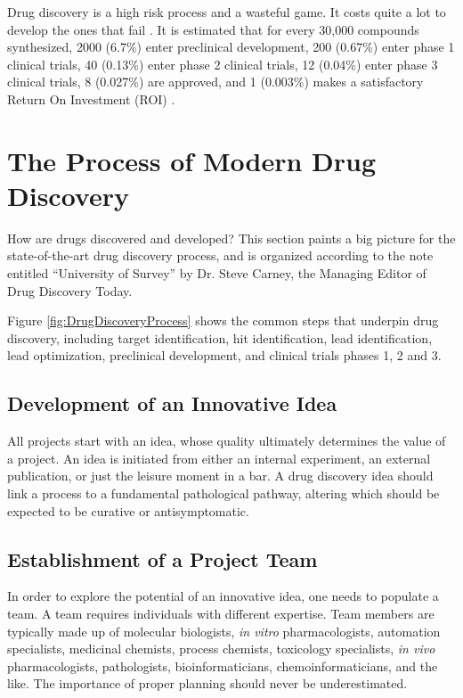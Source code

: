 Drug discovery is a high risk process and a wasteful game. It costs quite a lot to develop the ones that fail \citep{688}. It is estimated that for every 30,000 compounds synthesized, 2000 (6.7\%) enter preclinical development, 200 (0.67\%) enter phase 1 clinical trials, 40 (0.13\%) enter phase 2 clinical trials, 12 (0.04\%) enter phase 3 clinical trials, 8 (0.027\%) are approved, and 1 (0.003\%) makes a satisfactory Return On Investment (ROI) \citep{713}.

\section{The Process of Modern Drug Discovery}

How are drugs discovered and developed? This section paints a big picture for the state-of-the-art drug discovery process, and is organized according to the note entitled ``University of Survey'' by Dr. Steve Carney, the Managing Editor of Drug Discovery Today.

Figure \ref{fig:DrugDiscoveryProcess} \citep{716} shows the common steps that underpin drug discovery, including target identification, hit identification, lead identification, lead optimization, preclinical development, and clinical trials phases 1, 2 and 3.

\subsection{Development of an Innovative Idea}

All projects start with an idea, whose quality ultimately determines the value of a project. An idea is initiated from either an internal experiment, an external publication, or just the leisure moment in a bar. A drug discovery idea should link a process to a fundamental pathological pathway, altering which should be expected to be curative or antisymptomatic.

\subsection{Establishment of a Project Team}

In order to explore the potential of an innovative idea, one needs to populate a team. A team requires individuals with different expertise. Team members are typically made up of molecular biologists, \textit{in vitro} pharmacologists, automation specialists, medicinal chemists, process chemists, toxicology specialists, \textit{in vivo} pharmacologists, pathologists, bioinformaticians, chemoinformaticians, and the like. The importance of proper planning should never be underestimated.

